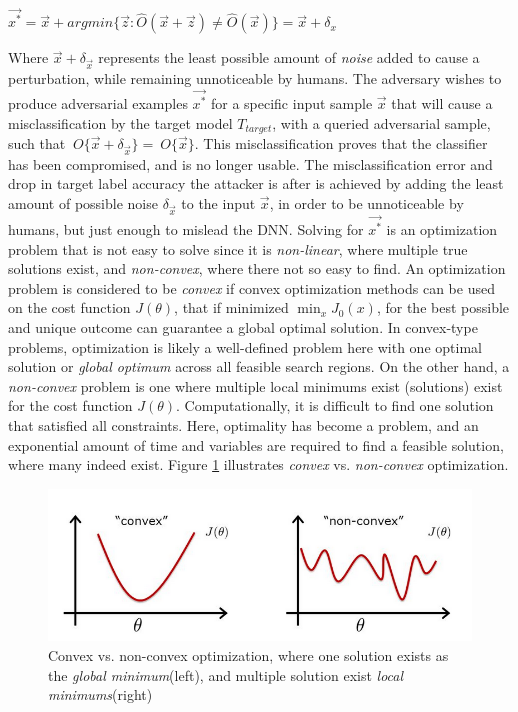 \documentclass[grad,lot,lof,11pt,oneside,onehalfspace]{RUthesis}
\begin{document}
\centerline{$\vec{x^{*}} = \vec{x} + argmin\{\vec{z}:\hat{O}(\vec{x}+\vec{z})\neq\hat{O}(\vec{x})\}= \vec{x} + \delta_{x}$}
Where $\vec{x} + \delta_{\vec{x}}$ represents the least possible amount of \textit{noise} added to cause a perturbation, while remaining unnoticeable by humans.
The adversary wishes to produce adversarial examples $\vec{x^{*}}$ for a specific input sample $\vec{x}$ that will cause a misclassification by the target model \textit{$T_{target}$}, with a queried adversarial sample, such that $~{O}\{\vec{x}+\delta_{\vec{x}}\} = ~{O}\{\vec{x}\}$. This misclassification proves that the classifier has been compromised, and is no longer usable. The misclassification error and drop in target label accuracy the attacker is after is achieved by adding the least amount of possible noise $\delta_{\vec{x}}$ to the input \textit{$\vec{x}$}, in order to be unnoticeable by humans, but just enough to mislead the DNN. Solving for $\vec{x^{*}}$  is an optimization problem that is not easy to solve since it is \textit{non-linear}, where multiple true solutions exist, and \textit{non-convex}, where there not so easy to find. An optimization problem is considered to be \textit{convex} if convex optimization methods can be used on the cost function \textit{$J(\theta)$}, that if minimized $\min_{x} J_{0}(x)$, for the best possible and unique outcome can guarantee a global optimal solution. In convex-type problems, optimization is likely a well-defined problem here with one optimal solution or \textit{global optimum} across all feasible search regions. On the other hand, a \textit{non-convex} problem is one where multiple local minimums exist (solutions) exist for the cost function \textit{$J(\theta)$}. Computationally, it is difficult to find one solution that satisfied all constraints. Here, optimality has become a problem, and an exponential amount of time and variables are required to find a feasible solution, where many indeed exist. Figure \ref{fig:ConvexvsNon} illustrates \textit{convex} vs. \textit{non-convex} optimization.  
\begin{figure}[h]
\centering
\includegraphics[width=0.7\linewidth]{"Images/Chapter 2/ConvexvsNon"}
\caption{Convex vs. non-convex optimization, where one solution exists as the \textit{global minimum}(left), and multiple solution exist \textit{local minimums}(right)}
\label{fig:ConvexvsNon}
\end{figure}
\end{document}
